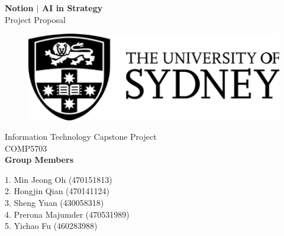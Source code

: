 \documentclass[12pt]{article}
\begin{document}
\begin{titlepage}
\begin{center} 
\Huge{\bfseries Notion $|$ AI in Strategy} \\
[1.5cm]
\huge{Project Proposal} \\
[1.5cm]
\begin{figure}[h] 
\centering\includegraphics[width=12cm]{usyd} 
\end{figure} 
\huge{Information Technology Capstone Project\\COMP5703} \\
[3CM]
\LARGE{\bfseries Group Members} \\
[1cm]
\end{center}
\LARGE{ 1. Min Jeong Oh (470151813) \\ 2. Hongjin Qian (470141124) \\ 3. Sheng Yuan (430058318)\\4. Prerona Majumder (470531989)\\5.	Yichao Fu (460283988)}
\end{titlepage}

\end{document}
